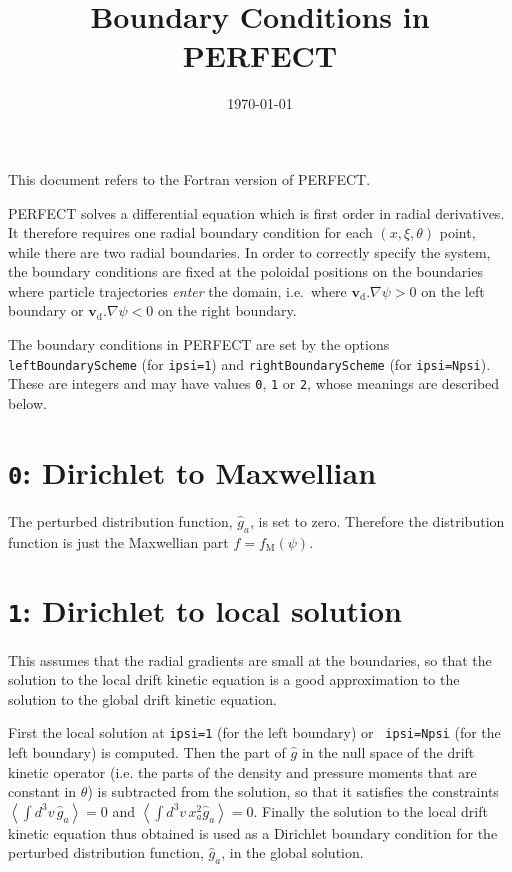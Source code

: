 \documentclass[12pt]{article}
\title{Boundary Conditions in PERFECT}
\date{\today}
\begin{document}
\maketitle

This document refers to the Fortran version of PERFECT.

PERFECT solves a differential equation which is first order in radial
derivatives. It therefore requires one radial boundary condition for each
$(x,\xi,\theta)$ point, while there are two radial boundaries. In order to
correctly specify the system, the boundary conditions are fixed at the poloidal
positions on the boundaries where particle trajectories {\em enter} the domain,
i.e.~where $\boldsymbol{v}_\mathrm{d}.\nabla\psi>0$ on the left boundary or
$\boldsymbol{v}_\mathrm{d}.\nabla\psi<0$ on the right boundary.

The boundary conditions in PERFECT are set by the options {\tt
leftBoundaryScheme} (for {\tt ipsi=1}) and {\tt rightBoundaryScheme}
(for {\tt ipsi=Npsi}). These are integers and may have values {\tt 0}, {\tt 1}
or {\tt 2}, whose meanings are described below.


\section*{{\tt 0}: Dirichlet to Maxwellian}

The perturbed distribution function, $\hat{g}_a$, is set to zero. Therefore the
distribution function is just the Maxwellian part $f=f_\mathrm{M}(\psi)$.

\section*{{\tt 1}: Dirichlet to local solution}

This assumes that the radial gradients are small at the boundaries, so that the
solution to the local drift kinetic equation is a good approximation to the
solution to the global drift kinetic equation.

First the local solution at {\tt ipsi=1} (for the left boundary) or {\tt
ipsi=Npsi} (for the left boundary) is computed. Then the part of $\hat{g}$ in
the null space of the drift kinetic operator (i.e. the parts of the density and
pressure moments that are constant in $\theta$) is subtracted from the
solution, so that it satisfies the constraints $\left< \int d^3v\, \hat{g}_a
\right> = 0$ and $\left< \int d^3v\, x_a^2 \hat{g}_a \right> = 0$. Finally the
solution to the local drift kinetic equation thus obtained is used as a
Dirichlet boundary condition for the perturbed distribution function,
$\hat{g}_a$, in the global solution.
\end{document}
